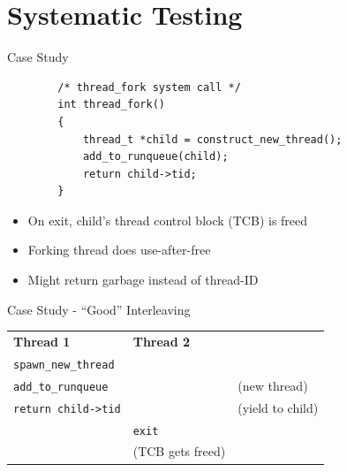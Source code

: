 \documentclass[xcolor=dvipsnames]{beamer}
\begin{document}
\newcommand\related[1]{\textsuperscript{\em [#1]}}

\newcommand\dontcompilethis[1]{}


\section{Systematic Testing}


\begin{frame}[fragile]{Case Study}
	\begin{center}
	\begin{verbatim}
	    /* thread_fork system call */
	    int thread_fork()
	    {
	        thread_t *child = construct_new_thread();
	        add_to_runqueue(child);
	        return child->tid;
	    }
	\end{verbatim}
	\end{center}
	\pause

	\begin{itemize}
		\item On exit, child's thread control block (TCB) is freed
		\item Forking thread does use-after-free
		\item Might return garbage instead of thread-ID
	\end{itemize}
\end{frame}

\begin{frame}{Case Study - ``Good'' Interleaving}
	\begin{tabular}{|l|l|l}
		\cline{1-2}
		{\bf Thread 1} & {\bf Thread 2} & \\
		\cline{1-2}
		\texttt{spawn\_new\_thread} && \\
		\cline{1-2}
		\texttt{add\_to\_runqueue} && (new thread) \\
		\cline{1-2}
		\texttt{return child->tid} && (yield to child) \\
		\cline{1-2}
		& \texttt{exit} & \\
		\cline{1-2}
		& (TCB gets freed) & \\
		\cline{1-2}
	\end{tabular}
\end{frame}
\end{document}
